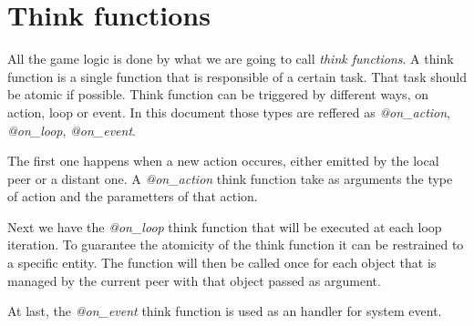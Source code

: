 \section{Think functions}

All the game logic is done by what we are going to call \textit{think functions}. A think function is a single function that is responsible of a certain task. That task should be atomic if possible.
Think function can be triggered by different ways, on action, loop or event. In this document those types are reffered as \textit{@on\_action}, \textit{@on\_loop}, \textit{@on\_event}.

The first one happens when a new action occures, either emitted by the local peer or a distant one. A \textit{@on\_action} think function take as arguments the type of action and the parametters of that action.

Next we have the \textit{@on\_loop} think function that will be executed at each loop iteration. To guarantee the atomicity of the think function it can be restrained to a specific entity. The function will then be called once for each object that is managed by the current peer with that object passed as argument.

At last, the \textit{@on\_event} think function is used as an handler for system event.
